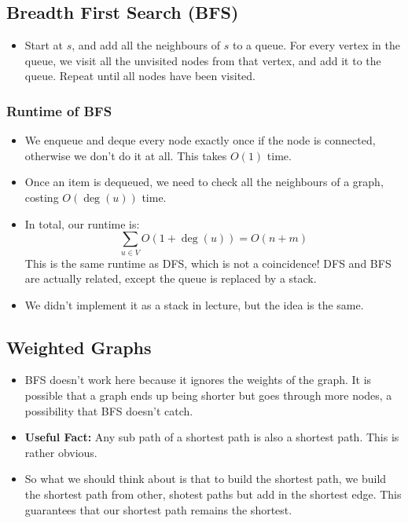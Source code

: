\documentclass[10pt]{article}
\begin{document}
	\subsection{Breadth First Search (BFS)}
	\begin{itemize}
		\item Start at $s$, and add all the neighbours of $s$ to a queue. For every vertex in 
			the queue, we visit all the unvisited nodes from that vertex, and add it to the queue. Repeat
			until all nodes have been visited.
	\end{itemize}

	\subsubsection{Runtime of BFS}
	\begin{itemize}
		\item 	We enqueue and deque every node exactly once if the node is connected, otherwise we don't do it 
			at all. This takes $O(1)$ time. 
		\item Once an item is dequeued, we need to check all the neighbours of a graph, costing $O(\deg(u))$ 
			time.
		\item In total, our runtime is:
			\[
				\sum_{u \in V} O(1 + \deg(u)) = O(n + m)
			\] 
			This is the same runtime as DFS, which is not a coincidence! DFS and BFS are actually related, 
			except the queue is replaced by a stack.
		\item We didn't implement it as a stack in lecture, but the idea is the same.
	\end{itemize}

	\subsection{Weighted Graphs}
	\begin{itemize}
		\item BFS doesn't work here because it ignores the weights of the graph. It is possible that a graph 
			ends up being shorter but goes through more nodes, a possibility that BFS doesn't catch.
		\item \textbf{Useful Fact:} Any sub path of a shortest path is also a shortest path. This is rather 
			obvious.
		\item So what we should think about is that to build the shortest path, we build the shortest path from 
			other, shotest paths but add in the shortest edge. This guarantees that our shortest path 
			remains the shortest.
	\end{itemize}
\end{document}
